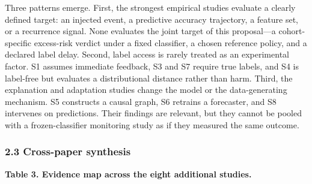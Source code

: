 \documentclass[
]{article}
\begin{document}
Three patterns emerge. First, the strongest empirical studies evaluate a
clearly defined target: an injected event, a predictive accuracy
trajectory, a feature set, or a recurrence signal. None evaluates the
joint target of this proposal---a cohort-specific excess-risk verdict
under a fixed classifier, a chosen reference policy, and a declared
label delay. Second, label access is rarely treated as an experimental
factor. S1 assumes immediate feedback, S3 and S7 require true labels,
and S4 is label-free but evaluates a distributional distance rather than
harm. Third, the explanation and adaptation studies change the model or
the data-generating mechanism. S5 constructs a causal graph, S6 retrains
a forecaster, and S8 intervenes on predictions. Their findings are
relevant, but they cannot be pooled with a frozen-classifier monitoring
study as if they measured the same outcome.

\hypertarget{cross-paper-synthesis}{%
\subsubsection{2.3 Cross-paper synthesis}\label{cross-paper-synthesis}}

\textbf{Table 3. Evidence map across the eight additional studies.}
\end{document}
